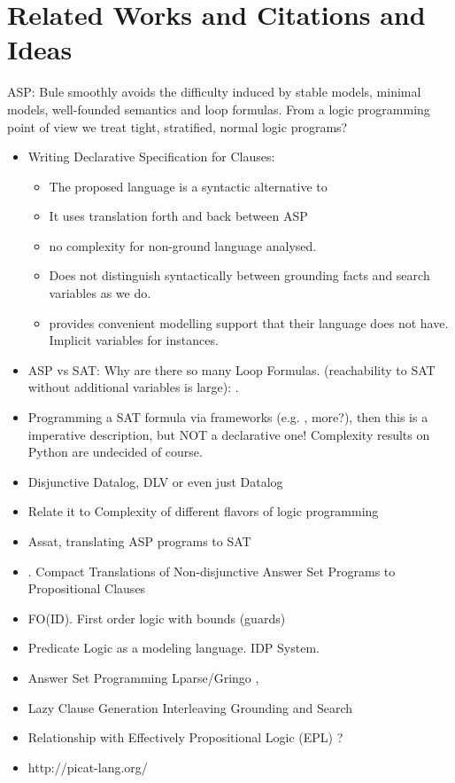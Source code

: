 \documentclass[runningheads]{llncs}
\begin{document}
\section{Related Works and Citations and Ideas}

ASP: Bule smoothly avoids the difficulty induced by stable models, minimal models, well-founded 
semantics and loop formulas. From a logic programming point of view we treat tight, stratified, normal logic programs?

\begin{itemize}
    \item Writing Declarative Specification for Clauses: \cite{Gebser16} 
        \begin{itemize}
            \item The proposed language is a syntactic alternative to \bcore
            \item It uses translation forth and back between ASP
            \item no complexity for non-ground language analysed. 
            \item Does not distinguish syntactically between grounding facts and search variables as we do. 
            \item \bnice provides convenient modelling support that their language does not have. Implicit variables for instances. 
        \end{itemize}
    \item ASP vs SAT: Why are there so many Loop Formulas. (reachability to SAT without additional variables is large): \cite{Lifschitz04} .
    \item Programming a SAT formula via frameworks (e.g. \cite{Pysat18},
        more?), then this is a imperative description, but NOT a declarative
        one! Complexity results on Python are undecided of course. 
    \item Disjunctive Datalog, DLV \cite{Eiter97} or even just Datalog \cite{Gottlob89}
    \item Relate it to Complexity of different flavors of logic programming \cite{Gottlob01}
    \item Assat, translating ASP programs to SAT \cite{Lin04}
    \item \cite{Janhunen11}. Compact Translations of Non-disjunctive Answer Set
        Programs to Propositional Clauses
    \item FO(ID). First order logic with bounds (guards) \cite{Wittocx10}
    \item Predicate Logic as a modeling language. IDP System. \cite{Cat18}
    \item Answer Set Programming Lparse/Gringo \cite{Gebser15}, \cite{Ferraris05}
    \item Lazy Clause Generation Interleaving Grounding and Search \cite{Cat15}
    \item Relationship with Effectively Propositional Logic (EPL) \cite{Moura08}? 
    \item http://picat-lang.org/
\end{itemize}
 


\end{document}
